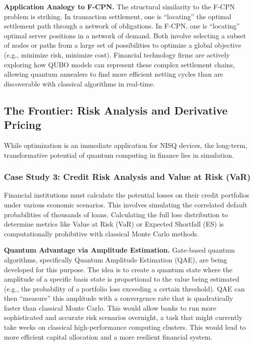 \documentclass[11pt,a4paper]{article}
\begin{document}
\textbf{Application Analogy to F-CPN.} The structural similarity to the F-CPN problem is striking. In transaction settlement, one is ``locating'' the optimal settlement path through a network of obligations. In F-CPN, one is ``locating'' optimal server positions in a network of demand. Both involve selecting a subset of nodes or paths from a large set of possibilities to optimize a global objective (e.g., minimize risk, minimize cost). Financial technology firms are actively exploring how QUBO models can represent these complex settlement chains, allowing quantum annealers to find more efficient netting cycles than are discoverable with classical algorithms in real-time.

\subsection{The Frontier: Risk Analysis and Derivative Pricing}

While optimization is an immediate application for NISQ devices, the long-term, transformative potential of quantum computing in finance lies in simulation.

\subsubsection{Case Study 3: Credit Risk Analysis and Value at Risk (VaR)}

Financial institutions must calculate the potential losses on their credit portfolios under various economic scenarios. This involves simulating the correlated default probabilities of thousands of loans. Calculating the full loss distribution to determine metrics like Value at Risk (VaR) or Expected Shortfall (ES) is computationally prohibitive with classical Monte Carlo methods.

\textbf{Quantum Advantage via Amplitude Estimation.} Gate-based quantum algorithms, specifically Quantum Amplitude Estimation (QAE), are being developed for this purpose. The idea is to create a quantum state where the amplitude of a specific basis state is proportional to the value being estimated (e.g., the probability of a portfolio loss exceeding a certain threshold). QAE can then ``measure'' this amplitude with a convergence rate that is quadratically faster than classical Monte Carlo. This would allow banks to run more sophisticated and accurate risk scenarios overnight, a task that might currently take weeks on classical high-performance computing clusters. This would lead to more efficient capital allocation and a more resilient financial system.
\end{document}
